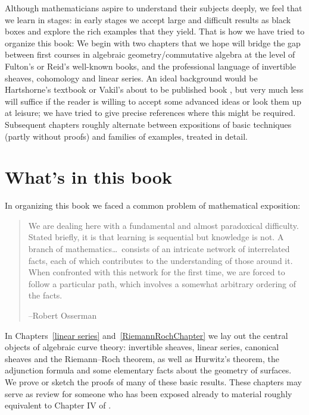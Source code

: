 Although mathematicians aspire to understand their subjects deeply, we feel that we learn in stages: in early stages we accept large and difficult results as black boxes and explore the rich examples that they yield. That is how we have tried to organize this book: 
We begin with two chapters that we hope will bridge the gap between
first courses in algebraic geometry/commutative algebra at the level
of Fulton's \citeyear{Fulton1989} or Reid's \citeyear{MR982494}
well-known books, and the professional language of invertible sheaves,
cohomology and linear series. An ideal background would 
be Hartshorne's textbook \citeyear{Hartshorne1977} or Vakil's 
about to be published book
\citeyear{Vakil-notes}, but very much less will suffice if the reader is
willing to accept some advanced ideas or look them up at leisure; we
have tried to give precise references where this might be required.
Subsequent chapters roughly alternate between expositions of basic
techniques (partly without proofs) and families of examples, treated
in detail.  

\section*{What's in this book}
In organizing this book we faced a common problem of  mathematical exposition:
\begin{quote}
\small\sf
We are dealing here with a fundamental and almost paradoxical difficulty. Stated briefly, it is that learning is sequential but knowledge is not. A branch of mathematics\dots\ consists of an intricate network of interrelated facts, each of which contributes to the understanding of those around it. When confronted with this network for the first time, we are forced to follow a particular path, which involves a somewhat arbitrary ordering of the facts.

--Robert 
Osserman
\citeyear{Poetry}
%
\end{quote}

In Chapters~\ref{linear series} and~\ref{RiemannRochChapter} we lay
out the central objects of algebraic curve theory: invertible sheaves,
linear series, canonical sheaves and the Riemann--Roch theorem, as well as
Hurwitz's theorem,
the adjunction formula and  some elementary facts about the geometry of surfaces. We prove or sketch the
proofs of many of these basic results. These chapters may serve as review for someone who has been exposed already to material roughly equivalent to Chapter IV of \cite{Hartshorne1977}. 

